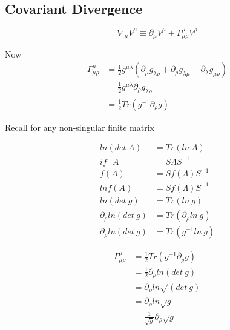 \documentclass[12pt, letterpaper]{article}
\newcommand*{\1}{\hspace{1pt}}
\begin{document}
    \subsection*{Covariant Divergence}

        \begin{equation}
            \nabla _{\mu} V^{\mu} \equiv \partial _{\mu} V^{\mu} + \Gamma ^{\mu} _{\mu \rho} V^{\rho}
        \end{equation}

        Now 
        \begin{equation}
            \begin{split}
            \Gamma ^{\mu} _{\mu \rho} & = \frac{1}{2} g^{\mu \lambda}(\partial _{\mu}g_{\lambda \rho} + \partial _{\rho}g_{\lambda \mu} - \partial_{\lambda}g_{\mu \rho}) \\ 
             & = \frac{1}{2} g^{\mu \lambda} \partial _{\rho}g_{\lambda \rho} \\ 
             & = \frac{1}{2} Tr (g ^{-1} \partial _{\rho}g)
            \end{split}
        \end{equation}

        Recall for any non-singular finite matrix 

        \begin{equation}
            \begin{split}
                ln(det \ A) & = Tr (ln \ A) \\ 
                if \ \ \  A & = S \Lambda S ^{-1} \\ 
                f(A) & = S f(\Lambda) S ^{-1} \\ 
                ln f(A) & = S f(\Lambda) S ^{-1}\\ 
                ln (det \ g) & = Tr (ln \ g) \\ 
                \partial_{\rho} ln (det \ g) & = Tr (\partial_{\rho} ln \ g) \\ 
                \partial_{\rho} ln (det \ g) & = Tr ( g ^{-1} ln \ g) 
            \end{split}
        \end{equation}

        \begin{equation}
            \begin{split}
                \Gamma ^{\mu} _{\mu \rho} & = \frac{1}{2} Tr (g ^{-1} \partial _{\rho}g) \\
                 & = \frac{1}{2} \partial _{\rho} ln  ( det \ g) \\ 
                 & = \partial _{\rho} ln  \sqrt{( det \ g)}  \\
                 & = \partial _{\rho} ln  \sqrt{g}  \\
                 & = \frac{1}{\sqrt{g}} \partial _{\rho}\sqrt{g}
            \end{split}
        \end{equation}
\end{document}
